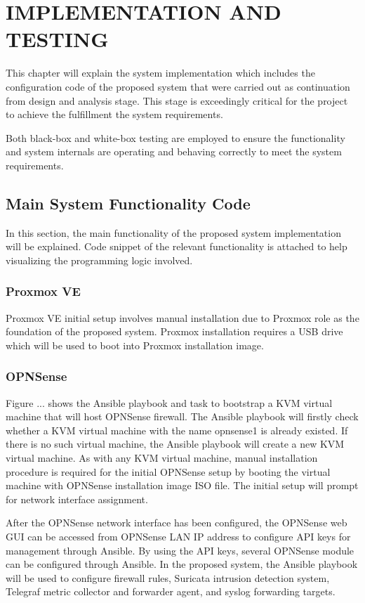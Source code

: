 \documentclass[../index.tex]{subfiles}
\begin{document}
\chapter{IMPLEMENTATION AND TESTING}

This chapter will explain the system implementation which includes the configuration code of the
proposed system that were carried out as continuation from design and analysis stage. This stage is
exceedingly critical for the project to achieve the fulfillment the system requirements. 

Both black-box and white-box testing are employed to ensure the functionality and system internals
are operating and behaving correctly to meet the system requirements.

\section{Main System Functionality Code}

In this section, the main functionality of the proposed system implementation will be explained.
Code snippet of the relevant functionality is attached to help visualizing the programming logic
involved.

\subsection{Proxmox VE}

Proxmox VE initial setup involves manual installation due to Proxmox role as the foundation of the
proposed system. Proxmox installation requires a USB drive which will be used to boot into Proxmox
installation image.

\subsection{OPNSense}

Figure ... shows the Ansible playbook and task to bootstrap a KVM virtual machine that will host
OPNSense firewall. The Ansible playbook will firstly check whether a KVM virtual machine with the
name opnsense1 is already existed. If there is no such virtual machine, the Ansible playbook will
create a new KVM virtual machine. As with any KVM virtual machine, manual installation procedure is
required for the initial OPNSense setup by booting the virtual machine with OPNSense installation
image ISO file. The initial setup will prompt for network interface assignment.

After the OPNSense network interface has been configured, the OPNSense web GUI can be accessed from
OPNSense LAN IP address to configure API keys for management through Ansible. By using the API keys,
several OPNSense module can be configured through Ansible. In the proposed system, the Ansible
playbook will be used to configure firewall rules, Suricata intrusion detection system, Telegraf
metric collector and forwarder agent, and syslog forwarding targets. 
\end{document}
